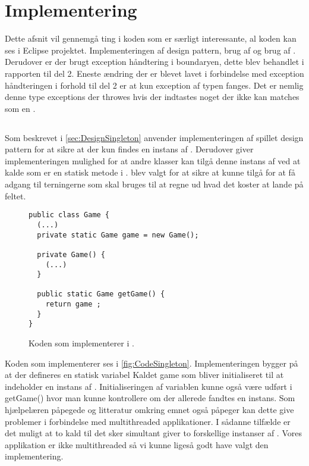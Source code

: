 \chapter{Implementering}\label{chap:Implementering}
Dette afsnit vil gennemgå ting i koden som er særligt interessante, al koden kan ses i Eclipse projektet. Implementeringen af  design pattern, brug af  og brug af . Derudover er der brugt exception håndtering i boundaryen, dette blev behandlet i rapporten til del 2. Eneste ændring der er blevet lavet i forbindelse med exception håndteringen i forhold til del 2 er at kun exception af typen  fanges. Det er nemlig denne type exceptions der throwes hvis der indtastes noget der ikke kan matches som en . \cite{javaExceptionInputMismatchException}

\section{}
Som beskrevet i \vref{sec:DesignSingleton} anvender implementeringen af spillet  design pattern for at sikre at der kun findes en instans af . Derudover giver implementeringen mulighed for at andre klasser kan tilgå denne instans af  ved at kalde  som er en statisk metode i .  blev valgt for at sikre at  kunne tilgå  for at få adgang til terningerne som skal bruges til at regne ud hvad det koster at lande på feltet.

\begin{figure}
\caption{Koden som implementerer  i .}
\label{fig:CodeSingleton}
\centering
\begin{lstlisting}
public class Game {
  (...)
  private static Game game = new Game();

  private Game() {
    (...)
  }

  public static Game getGame() {
    return game ;
  }
}
\end{lstlisting}
\end{figure}

Koden som implementerer  ses i \vref{fig:CodeSingleton}. Implementeringen bygger på at der defineres en statisk variabel Kaldet game som bliver initialiseret til at indeholder en instans af . Initialiseringen af variablen kunne også være udført i getGame() hvor man kunne kontrollere om der allerede fandtes en instans. Som hjælpelæren påpegede og litteratur omkring emnet også påpeger kan dette give problemer i forbindelse med multithreaded applikationer. I sådanne tilfælde er det muligt at to kald til  det sker simultant giver to forskellige instanser af . Vores applikation er ikke multithreaded så vi kunne ligeså godt have valgt den implementering.

